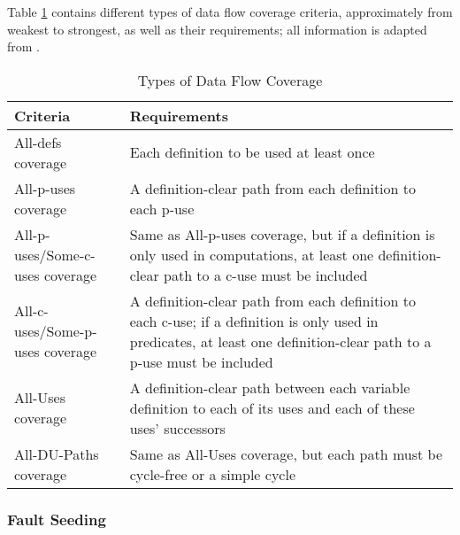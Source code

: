 Table \ref{table:data-flow-coverage-types} contains different types of data
flow coverage criteria, approximately from weakest to strongest, as well as
their requirements; all information is adapted from
\cite[pp.~424-425]{van_vliet_software_2000} .

\begin{table}[hbtp!]
      \centering
      \caption{Types of Data Flow Coverage}
      \label{table:data-flow-coverage-types}
      \begin{tabularx}{\textwidth}{|>{\hsize=0.65\hsize}X|>{\hsize=1.35\hsize}X|}
            \hline
            \rowcolor{McMasterMediumGrey}
            \textbf{Criteria}         & \textbf{Requirements}                \\
            \hline
            All-defs coverage         & Each definition to be used at least
            once                                                             \\
            All-\acsp{p-use} coverage & A definition-clear path from each
            definition to each \acs{p-use}                                   \\
            All-\acsp{p-use}/Some-\acsp{c-use}
            coverage                  & Same as All-\acsp{p-use} coverage,
            but if a definition is only used in computations, at least one
            definition-clear path to a \acs{c-use} must be included          \\
            All-\acsp{c-use}/Some-\acsp{p-use}
            coverage                  & A definition-clear path from each
            definition to each \acs{c-use}; if a definition is only used
            in predicates, at least one definition-clear path to a
            \acs{p-use} must be included                                     \\
            All-Uses coverage         & A definition-clear path between each
            variable definition to each of its uses and each of these uses'
            successors                                                       \\
            All-DU-Paths coverage     & Same as All-Uses coverage, but each
            path must be cycle-free or a simple cycle                        \\
            \hline
      \end{tabularx}
\end{table}

\subsubsection{Fault Seeding \cite[pp.~427-428]{van_vliet_software_2000}}

